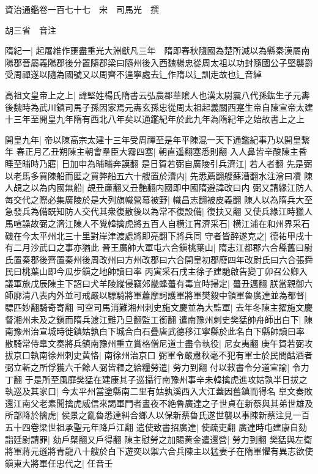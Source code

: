 資治通鑑卷一百七十七　宋　司馬光　撰

胡三省　音注

隋紀一|{
	起屠維作噩盡重光大淵獻凡三年　隋即春秋隨國為楚所滅以為縣秦漢屬南陽郡晉屬義陽郡後分置隨郡梁曰隨州後入西魏楊忠從周太祖以功封隨國公子堅襲爵受周禪遂以隨為國號又以周齊不遑寧處去辶作隋以辶訓走故也辶音綽}


高祖文皇帝上之上|{
	諱堅姓楊氏隋書云弘農郡華隂人也漢太尉震八代孫鈜生子元夀後魏時為武川鎮司馬子孫因家焉元夀玄孫忠從周太祖起義關西寔生帝自陳宣帝太建十三年至開皇九年隋有西北八年矣以通鑑紀年於此九年為隋紀年之始故書上之上}


開皇九年|{
	帝以陳高宗太建十三年受周禪至是年平陳混一天下通鑑紀事乃以開皇繋年}
春正月乙丑朔陳主朝會羣臣大霧四塞|{
	朝直遥翻塞悉則翻}
入人鼻皆辛酸陳主昏睡至晡時乃寤|{
	日加申為晡晡奔謨翻}
是日賀若弼自廣陵引兵濟江|{
	若人者翻}
先是弼以老馬多買陳船而匿之買弊船五六十艘置於瀆内|{
	先悉薦翻艘蘇漕翻水注澮曰凟}
陳人覘之以為内國無船|{
	覘丑亷翻又丑艶翻内國即中國隋避諱改曰内}
弼又請緣江防人每交代之際必集廣陵於是大列旗幟營幕被野|{
	幟昌志翻被皮義翻}
陳人以為隋兵大至急發兵為備既知防人交代其衆復散後以為常不復設備|{
	復扶又翻}
又使兵緣江時獵人馬喧譟故弼之濟江陳人不覺韓擒虎將五百人自横江宵濟采石|{
	横江浦在和州界采石磯在今太平州北三十里對岸津渡處將即亮翻下將兵同}
守者皆醉遂克之|{
	德祐甲戌十有二月沙武口之事亦猶此}
晉王廣帥大軍屯六合鎭桃葉山|{
	隋志江都郡六合縣舊曰尉氏置秦郡後齊置秦州後周改州曰方州改郡曰六合開皇初郡廢四年改尉氏曰六合張舜民曰桃葉山即今瓜步鎭之地帥讀曰率}
丙寅采石戌主徐子建馳啟告變丁卯召公卿入議軍旅戊辰陳主下詔曰犬羊陵縱侵竊郊畿蜂蠆有毒宜時掃定|{
	蠆丑邁翻}
朕當親御六師廓清八表内外並可戒嚴以驃騎將軍蕭摩訶護軍將軍樊毅中領軍魯廣達並為都督|{
	驃匹妙翻騎奇寄翻}
司空司馬消難湘州刺史施文慶並為大監軍|{
	去年冬陳主擢施文慶督湘州未及之鎭而隋兵渡江難乃旦翻監工銜翻}
遣南豫州刺史樊猛帥舟師出白下|{
	陳南豫州治宣城時徙鎮姑孰白下城合白石疊唐武德移江寧縣於此名白下縣帥讀曰率}
散騎常侍臯文奏將兵鎮南豫州重立賞格僧尼道士盡令執役|{
	尼女夷翻}
庚午賀若弼攻拔京口執南徐州刺史黄恪|{
	南徐州治京口}
弼軍令嚴肅秋毫不犯有軍士於民間酤酒者弼立斬之所俘獲六千餘人弼皆釋之給糧勞遣|{
	勞力到翻}
付以敕書令分道宣諭|{
	令力丁翻}
于是所至風靡樊猛在建康其子巡攝行南豫州事辛未韓擒虎進攻姑孰半日拔之執巡及其家口|{
	今太平州當塗縣南二里有姑孰溪西入大江蓋因舊鎮而得名}
臯文奏敗還江南父老素聞擒虎威信來謁軍門者晝夜不絶魯廣達之子世貞在新蔡與其弟世雄及所部降於擒虎|{
	侯景之亂魯悉達糾合鄉人以保新蔡魯氏遂世襲以事陳新蔡注見一百五十四卷梁世祖承聖元年降戶江翻}
遣使致書招廣達|{
	使疏吏翻}
廣達時屯建康自劾詣廷尉請罪|{
	劾戶槩翻又戶得翻}
陳主慰勞之加賜黄金遣還營|{
	勞力到翻}
樊猛與左衛將軍蔣元遜將青龍八十艘於白下遊奕以禦六合兵陳主以猛妻子在隋軍懼有異志欲使鎭東大將軍任忠代之|{
	任音壬}
